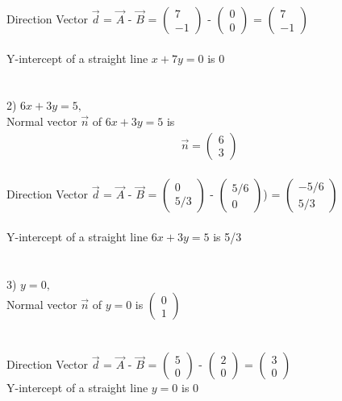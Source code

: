 \documentclass[journal,12pt,twocolumn]{IEEEtran}
\newcommand{\myvec}[1]{\ensuremath{\begin{pmatrix}#1\end{pmatrix}}}
\begin{document}
Direction Vector $\vec{d}$ = $\vec{A}$ - $\vec{B}$ = \myvec{ 7 \\ -1 } - \myvec{ 0 \\ 0 } = \myvec{ 7 \\ -1 }
\\
\\
Y-intercept of a straight line $ x  + 7y =  0 $ is 0
\\
\\
\\
2) $ 6x  + 3y =  5,$
\\
Normal vector $\vec{n}$ of $ 6x  + 3y = 5 $ is   \begin{align}
	\vec{n} = \myvec{ 6 \\ 3 }
\end{align}
\\
Direction Vector $\vec{d}$ = $\vec{A}$ - $\vec{B}$ = \myvec{ 0 \\ 5/3 } - \myvec{ 5/6 \\ 0 }) = \myvec{ -5/6 \\ 5/3 }
\\
\\
Y-intercept of a straight line $ 6x  + 3y =  5 $ is 5/3
\\
\\
\\
3) $ y =  0,$
\\
Normal vector $\vec{n}$ of $ y = 0 $ is   \myvec{ 0 \\ 1 }
\\
\\
\\
Direction Vector $\vec{d}$ = $\vec{A}$ - $\vec{B}$ = \myvec{ 5 \\ 0 } - \myvec{ 2 \\ 0 } = \myvec{ 3 \\ 0 }
\\
Y-intercept of a straight line $ y =  0 $ is 0
\end{document}
